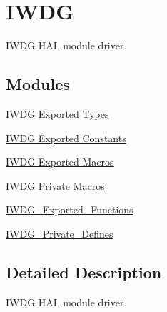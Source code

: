 \hypertarget{group___i_w_d_g}{\section{I\-W\-D\-G}
\label{group___i_w_d_g}
}


I\-W\-D\-G H\-A\-L module driver.  


\subsection*{Modules}
\begin{DoxyCompactItemize}
\item 
\hyperlink{group___i_w_d_g___exported___types}{I\-W\-D\-G Exported Types}
\item 
\hyperlink{group___i_w_d_g___exported___constants}{I\-W\-D\-G Exported Constants}
\item 
\hyperlink{group___i_w_d_g___exported___macros}{I\-W\-D\-G Exported Macros}
\item 
\hyperlink{group___i_w_d_g___private___macro}{I\-W\-D\-G Private Macros}
\item 
\hyperlink{group___i_w_d_g___exported___functions}{I\-W\-D\-G\-\_\-\-Exported\-\_\-\-Functions}
\item 
\hyperlink{group___i_w_d_g___private___defines}{I\-W\-D\-G\-\_\-\-Private\-\_\-\-Defines}
\end{DoxyCompactItemize}


\subsection{Detailed Description}
I\-W\-D\-G H\-A\-L module driver. 